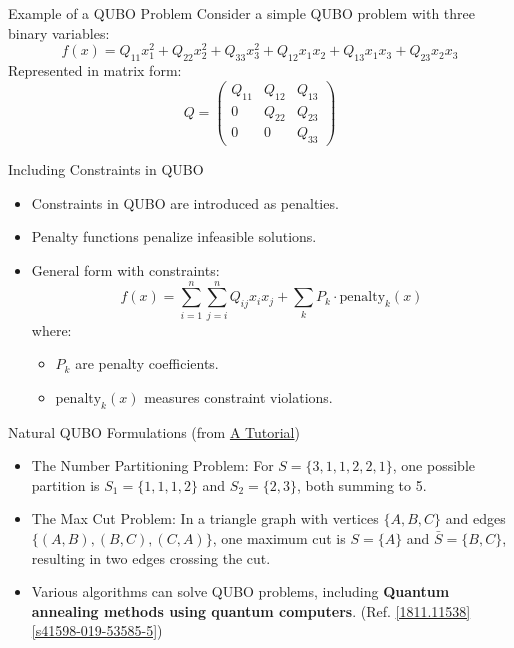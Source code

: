 \documentclass{beamer}
\begin{document}
	\begin{frame}[fragile]{Example of a QUBO Problem}
		Consider a simple QUBO problem with three binary variables:
		\[
		f(x) = Q_{11} x_1^2 + Q_{22} x_2^2 + Q_{33} x_3^2 + Q_{12} x_1 x_2 +Q_{13} x_1 x_3 + Q_{23} x_2 x_3
		\]
		Represented in matrix form:
		\[
		Q = \begin{pmatrix}
			Q_{11} & Q_{12} & Q_{13} \\
			0 & Q_{22} & Q_{23} \\
			0 & 0 & Q_{33}
		\end{pmatrix}
		\]
	\end{frame}
	\begin{frame}{Including Constraints in QUBO}
		\begin{itemize}
			\item Constraints in QUBO are introduced as penalties.
			\item Penalty functions penalize infeasible solutions.
			\item General form with constraints:
			\[
			f(x) = \sum_{i=1}^n \sum_{j=i}^n Q_{ij} x_i x_j + \sum_{k} P_k \cdot \text{penalty}_k(x)
			\]
			where:
			\begin{itemize}
				\item \(P_k\) are penalty coefficients.
				\item \(\text{penalty}_k(x)\) measures constraint violations.
			\end{itemize}
		\end{itemize}
	\end{frame}
	\begin{frame}{Natural QUBO Formulations (from \href{https://optimization-online.org/wp-content/uploads/2019/01/7014.pdf}{A Tutorial})}
		\begin{itemize}
			\item The Number Partitioning Problem: For \( S = \{3, 1, 1, 2, 2, 1\} \), one possible partition is \( S_1 = \{1, 1, 1, 2\} \) and \( S_2 = \{2, 3\} \), both summing to 5.
			
			\item The Max Cut Problem: In a triangle graph with vertices \( \{A, B, C\} \) and edges \( \{(A, B), (B, C), (C, A)\} \), one maximum cut is \( S = \{A\} \) and \( \bar{S} = \{B, C\} \), resulting in two edges crossing the cut.
		\end{itemize}
		\begin{itemize}
			\item Various algorithms can solve QUBO problems, including \textbf{Quantum annealing methods using quantum computers}. (Ref. \href{https://arxiv.org/pdf/1811.11538}{[1811.11538]}\href{https://www.nature.com/articles/s41598-019-53585-5}{[s41598-019-53585-5]})
		\end{itemize}
	\end{frame}
	
\end{document}
